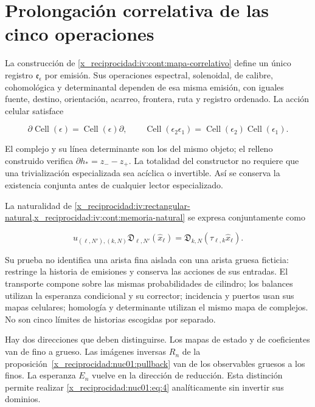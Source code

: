 \section{Prolongación correlativa de las cinco operaciones}

La construcción de \cref{x_reciprocidad:iv:cont:mapa-correlativo} define un único registro \(\mathfrak e_\epsilon\) por emisión. Sus operaciones espectral, solenoidal, de calibre, cohomológica y determinantal dependen de esa misma emisión, con iguales fuente, destino, orientación, acarreo, frontera, ruta y registro ordenado. La acción celular satisface

\[
\partial\operatorname{Cell}(\epsilon)=\operatorname{Cell}(\epsilon)\partial,
\qquad
\operatorname{Cell}(\epsilon_2\epsilon_1)
=\operatorname{Cell}(\epsilon_2)\operatorname{Cell}(\epsilon_1).
\]

El complejo y su línea determinante son los del mismo objeto; el relleno construido verifica \(\partial h_*=z_--z_+\). La totalidad del constructor no requiere que una trivialización especializada sea acíclica o invertible. Así se conserva la existencia conjunta antes de cualquier lector especializado.

La naturalidad de \cref{x_reciprocidad:iv:rectangular-natural,x_reciprocidad:iv:cont:memoria-natural} se expresa conjuntamente como

\begin{equation}
u_{(\ell,N'),(k,N)}\mathfrak D_{\ell,N'}(\widehat x_\ell)
=\mathfrak D_{k,N}(\tau_{\ell,k}\widehat x_\ell).
\label{x_reciprocidad:nuc01:eq:4}
\end{equation}

Su prueba no identifica una arista fina aislada con una arista gruesa ficticia: restringe la historia de emisiones y conserva las acciones de sus entradas. El transporte compone sobre las mismas probabilidades de cilindro; los balances utilizan la esperanza condicional y su corrector; incidencia y puertos usan sus mapas celulares; homología y determinante utilizan el mismo mapa de complejos. No son cinco límites de historias escogidas por separado.

Hay dos direcciones que deben distinguirse. Los mapas de estado y de coeficientes van de fino a grueso. Las imágenes inversas \(R_n\) de la proposición~\ref{x_reciprocidad:nuc01:pullback} van de los observables gruesos a los finos. La esperanza \(E_n\) vuelve en la dirección de reducción. Esta distinción permite realizar \eqref{x_reciprocidad:nuc01:eq:4} analíticamente sin invertir sus dominios.

